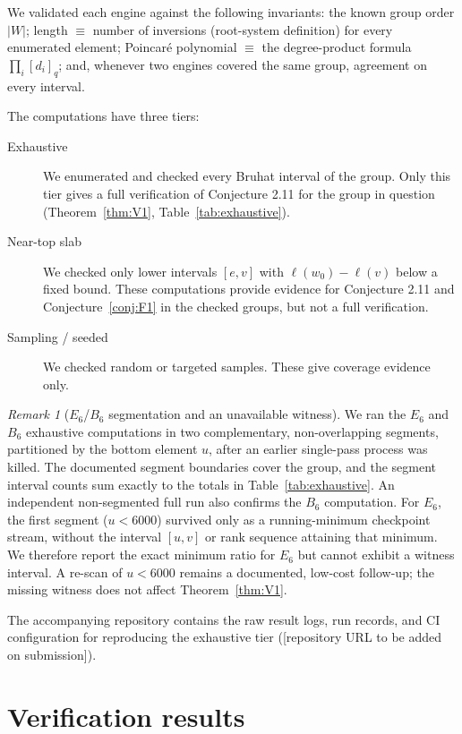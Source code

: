 \documentclass[11pt]{amsart}
\theoremstyle{plain}
\theoremstyle{definition}
\theoremstyle{remark}
\newtheorem{remark}[theorem]{Remark}
\newcommand{\W}{W}
\begin{document}
We validated each engine against the following invariants: the known group
order $|\W|$; length $\equiv$ number of inversions (root-system definition)
for every enumerated element; Poincar\'e polynomial $\equiv$ the
degree-product formula $\prod_i[d_i]_q$; and, whenever two engines covered
the same group, agreement on every interval.

The computations have three tiers:

\begin{description}
\item[Exhaustive] We enumerated and checked every Bruhat interval of the
group. Only this tier gives a full verification of Conjecture 2.11 for the
group in question (Theorem~\ref{thm:V1},
Table~\ref{tab:exhaustive}).
\item[Near-top slab] We checked only lower intervals $[e,v]$ with
$\ell(w_0)-\ell(v)$ below a fixed bound. These computations provide
evidence for Conjecture 2.11 and Conjecture~\ref{conj:F1} in the checked
groups, but not a full verification.
\item[Sampling / seeded] We checked random or targeted samples. These give
coverage evidence only.
\end{description}

\begin{remark}[$E_6$/$B_6$ segmentation and an unavailable witness]
\label{rem:e6segment}
We ran the $E_6$ and $B_6$ exhaustive computations in two complementary,
non-overlapping segments, partitioned by the bottom element $u$, after an
earlier single-pass process was killed. The documented segment boundaries
cover the group, and the segment interval counts sum exactly to the totals
in Table~\ref{tab:exhaustive}. An independent non-segmented full run also
confirms the $B_6$ computation. For $E_6$, the first segment ($u<6000$)
survived only as a running-minimum checkpoint stream, without the interval
$[u,v]$ or rank sequence attaining that minimum. We therefore report the
exact minimum ratio for $E_6$ but cannot exhibit a witness interval. A
re-scan of $u<6000$ remains a documented, low-cost follow-up; the missing
witness does not affect Theorem~\ref{thm:V1}.
\end{remark}

The accompanying repository contains the raw result logs, run records, and
CI configuration for reproducing the exhaustive tier
([repository URL to be added on submission]).

\section{Verification results}
\label{sec:results}
\end{document}
